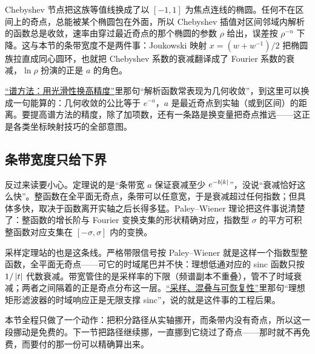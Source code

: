 Chebyshev 节点把这族等值线换成了以 \([-1,1]\) 为焦点连线的椭圆。任何不在区间上的奇点，总能被某个椭圆包在外面，所以 Chebyshev 插值对区间邻域内解析的函数总是收敛，速率由穿过最近奇点的那个椭圆的参数 \(\rho\) 给出，误差按 \(\rho^{-n}\) 下降。这与本节的条带宽度不是两件事：Joukowski 映射 \(x=(w+w^{-1})/2\) 把椭圆族拉直成同心圆环，也就把 Chebyshev 系数的衰减翻译成了 Fourier 系数的衰减，\(\ln\rho\) 扮演的正是 \(a\) 的角色。

\hyperref[sec:08-Numerical-Analysis/08-Fourier-and-Spectral-Methods/04]{``谱方法：用光滑性换高精度''}里那句``解析函数常表现为几何收敛''，到这里可以换成一句能算的：几何收敛的公比等于 \(e^{-a}\)，\(a\) 是最近奇点到实轴（或到区间）的距离。要提高谱方法的精度，除了加项数，还有一条路是换变量把奇点推远——这正是各类坐标映射技巧的全部意图。

\subsection{条带宽度只给下界}

反过来读要小心。定理说的是``条带宽 \(a\) 保证衰减至少 \(e^{-b\left|k\right|}\)''，没说``衰减恰好这么快''。整函数在全平面无奇点，条带可以任意宽，于是衰减超过任何指数；但具体多快，取决于函数离开实轴之后长得多猛。Paley--Wiener 理论把这件事说清楚了：整函数的增长阶与 Fourier 变换支集的形状精确对应，指数型 \(\sigma\) 的平方可积整函数对应支集在 \([-\sigma,\sigma]\) 内的变换。

采样定理站的也是这条线。严格带限信号按 Paley--Wiener 就是这样一个指数型整函数，全平面无奇点——可它的时域尾巴并不快：理想低通对应的 sinc 函数只按 \(1/\left|t\right|\) 代数衰减。带宽管住的是采样率的下限（频谱副本不重叠），管不了时域衰减；两者之间隔着的正是奇点分布这一层。\hyperref[sec:08-Numerical-Analysis/08-Fourier-and-Spectral-Methods/02]{``采样、混叠与可恢复性''}里那句``理想矩形滤波器的时域响应正是无限支撑 sinc''，说的就是这件事的工程后果。

本节全程只做了一个动作：把积分路径从实轴挪开，而条带内没有奇点，所以这一段挪动是免费的。下一节把路径继续挪，一直挪到它绕过了奇点——那时就不再免费，而要付的那一份可以精确算出来。
